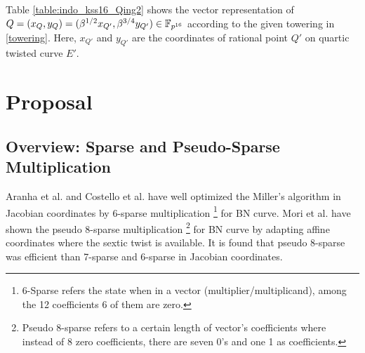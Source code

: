 Table \ref{table:indo_kss16_Qing2} shows the vector representation of $Q = (x_{Q},y_Q) = (\beta^{1/2}x_{Q'},\beta^{3/4}y_{Q'}) \in \mathbb{F}_{p^{16}}$ according to the given towering in \eqref{towering}. Here, $x_{Q'}$ and $y_{Q'}$ are the coordinates of rational point $Q'$ on quartic twisted curve $E'$. 
\renewcommand{\baselinestretch}{1.5}
\begin{table*}[t]
\caption{Vector representation of $Q = (x_Q,y_Q) \in \g2 \subset E(\mathbb{F}_{p^{16}})$}
\label{table:indo_kss16_Qing2}
\centering
{}
\end{table*}
\renewcommand{\baselinestretch}{1.0}
\section{Proposal}

\subsection{Overview: Sparse and Pseudo-Sparse Multiplication}
Aranha et al. \cite[Section 4]{EC:AKLGL11} and Costello et al. \cite{PKC:CosLanNae10} have  well optimized the Miller's algorithm in Jacobian coordinates by 6-sparse multiplication \footnote{\label{6sparse}{6-Sparse refers the state when in a vector (multiplier/multiplicand), among the 12 coefficients 6 of them are zero.}} for BN curve. 
Mori et al. \cite{PAIRING:MANS13} have  shown the pseudo  8-sparse multiplication \footnote{\label{pseudo8sparse}{Pseudo 8-sparse refers to a certain length of vector's coefficients where instead of 8 zero coefficients, there are seven  0's and one 1 as coefficients.}} for BN curve by adapting affine coordinates where the sextic twist is available. 
It is found that pseudo 8-sparse was efficient than 7-sparse and 6-sparse in Jacobian coordinates. 

